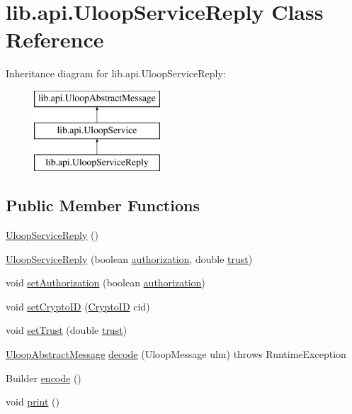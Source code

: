 \hypertarget{classlib_1_1api_1_1UloopServiceReply}{\section{lib.\+api.\+Uloop\+Service\+Reply Class Reference}
\label{classlib_1_1api_1_1UloopServiceReply}
}
Inheritance diagram for lib.\+api.\+Uloop\+Service\+Reply\+:\begin{figure}[H]
\begin{center}
\leavevmode
\includegraphics[height=3.000000cm]{classlib_1_1api_1_1UloopServiceReply}
\end{center}
\end{figure}
\subsection*{Public Member Functions}
\begin{DoxyCompactItemize}
\item 
\hyperlink{classlib_1_1api_1_1UloopServiceReply_ac3acd1326ef054d7f7e9d9c6aad50198}{Uloop\+Service\+Reply} ()
\item 
\hyperlink{classlib_1_1api_1_1UloopServiceReply_ac3b222046392ac4e530b0b72a5f39dc0}{Uloop\+Service\+Reply} (boolean \hyperlink{classlib_1_1api_1_1UloopServiceReply_a9fe9ecb4fca6ed06fe77c70adf42be11}{authorization}, double \hyperlink{classlib_1_1api_1_1UloopServiceReply_a5ad9fd3217140d290e9704e55dd6dc3b}{trust})
\item 
void \hyperlink{classlib_1_1api_1_1UloopServiceReply_ac194f67f052d8c8722a1a92859be49c0}{set\+Authorization} (boolean \hyperlink{classlib_1_1api_1_1UloopServiceReply_a9fe9ecb4fca6ed06fe77c70adf42be11}{authorization})
\item 
void \hyperlink{classlib_1_1api_1_1UloopServiceReply_a84259060d5524cc5e91f63700105785e}{set\+Crypto\+I\+D} (\hyperlink{classlib_1_1api_1_1CryptoID}{Crypto\+I\+D} cid)
\item 
void \hyperlink{classlib_1_1api_1_1UloopServiceReply_a7a2e472da008b2b8a513ec8f19fb50eb}{set\+Trust} (double \hyperlink{classlib_1_1api_1_1UloopServiceReply_a5ad9fd3217140d290e9704e55dd6dc3b}{trust})
\item 
\hyperlink{interfacelib_1_1api_1_1UloopAbstractMessage}{Uloop\+Abstract\+Message} \hyperlink{classlib_1_1api_1_1UloopServiceReply_a944ecbe5d5a40e6ae48ee884063f5c1d}{decode} (Uloop\+Message ulm)  throws Runtime\+Exception 
\item 
Builder \hyperlink{classlib_1_1api_1_1UloopServiceReply_a0ca29eaf04dce5493607e010b73f77d4}{encode} ()
\item 
void \hyperlink{classlib_1_1api_1_1UloopServiceReply_a825bbcd3250cc8ac980f3eda449c482f}{print} ()
\end{DoxyCompactItemize}
